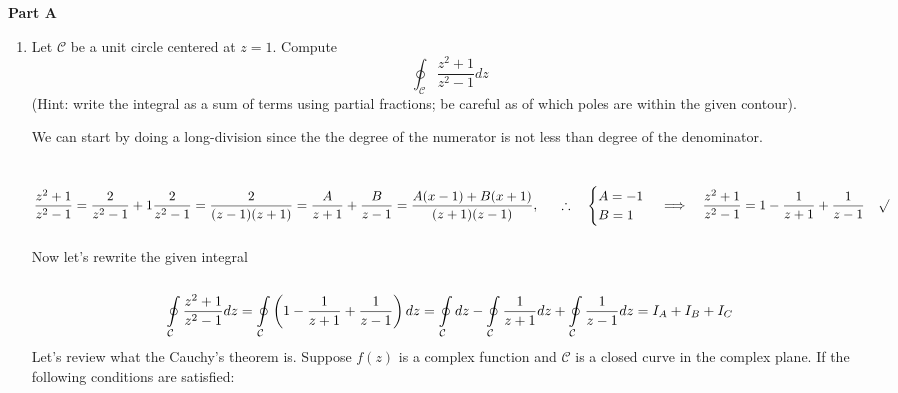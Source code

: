 \documentclass[fleqn]{article}
\begin{document}
  \textbf{Part A}
  \begin{enumerate}
    \item Let ${\mathcal C}$ be a unit circle centered at $z = 1$. Compute
      $$
      \oint_{\mathcal C}   \frac{z^2 + 1}{z^2 - 1} dz
      $$
      (Hint: write the integral as a sum of terms using partial fractions; be careful as of which poles are within the given contour). 

        \textcolor{hwColor}{
          We can start by doing a long-division since the the degree of the numerator is not 
          less than degree of the denominator.\\
          \\
          \\
          $
            \dfrac{z^2+1}{z^2-1}=\dfrac{2}{z^2-1}+1 \\
            \\
            \\
            \dfrac{2}{z^2-1}=\dfrac{2}{(z-1)(z+1)}=\dfrac{A}{z+1}+\dfrac{B}{z-1}=\dfrac{A(x-1)+B(x+1)}{(z+1)(z-1)},
            ~~~~~ \therefore ~~~ \begin{cases}
              A=-1 \\
              B=1
            \end{cases} \\
            \\
            \\
            \Longrightarrow ~~~ \dfrac{z^2+1}{z^2-1}=1-\dfrac{1}{z+1}+\dfrac{1}{z-1} ~~~ \surd \\
          $
          \\
          \\
          Now let's rewrite the given integral
          \\
          \\
          $$
            \oint\limits_{\mathcal C} \frac{z^2 + 1}{z^2 - 1} dz \\ \\
            =\oint\limits_{\mathcal C} \left(1-\dfrac{1}{z+1}+\dfrac{1}{z-1}\right) dz \\ \\
            =\oint\limits_{\mathcal C} dz-\oint\limits_{\mathcal C} \dfrac{1}{z+1}dz+\oint\limits_{\mathcal C}\dfrac{1}{z-1}dz=I_A+I_B+I_C
          $$
          Let's review what the Cauchy's theorem is. Suppose $f(z)$ is a complex function and $\mathcal{C}$ is a closed 
          curve in the complex plane. If the following conditions are satisfied:
          \begin{itemize}

\end{itemize}}
\end{enumerate}
\end{document}
